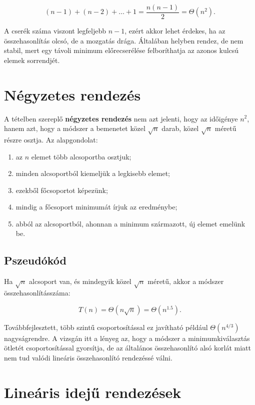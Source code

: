 \[
(n-1)+(n-2)+\dots+1=\frac{n(n-1)}{2}=\Theta(n^2).
\]

A cserék száma viszont legfeljebb $n-1$, ezért akkor lehet érdekes, ha az összehasonlítás olcsó, de a mozgatás drága. Általában helyben rendez, de nem stabil, mert egy távoli minimum előrecserélése felboríthatja az azonos kulcsú elemek sorrendjét.

\section{Négyzetes rendezés}

A tételben szereplő \textbf{négyzetes rendezés} nem azt jelenti, hogy az időigénye $n^2$, hanem azt, hogy a módszer a bemenetet közel $\sqrt n$ darab, közel $\sqrt n$ méretű részre osztja. Az alapgondolat:

\begin{enumerate}
  \item az $n$ elemet több alcsoportba osztjuk;
  \item minden alcsoportból kiemeljük a legkisebb elemet;
  \item ezekből főcsoportot képezünk;
  \item mindig a főcsoport minimumát írjuk az eredménybe;
  \item abból az alcsoportból, ahonnan a minimum származott, új elemet emelünk be.
\end{enumerate}

\subsection{Pszeudókód}


Ha $\sqrt n$ alcsoport van, és mindegyik közel $\sqrt n$ méretű, akkor a módszer összehasonlításszáma:

\[
T(n)=\Theta(n\sqrt n)=\Theta(n^{1.5}).
\]

Továbbfejlesztett, több szintű csoportosítással ez javítható például $\Theta(n^{4/3})$ nagyságrendre. A vizsgán itt a lényeg az, hogy a módszer a minimumkiválasztás ötletét csoportosítással gyorsítja, de az általános összehasonlító alsó korlát miatt nem tud valódi lineáris összehasonlító rendezéssé válni.

\section{Lineáris idejű rendezések}

